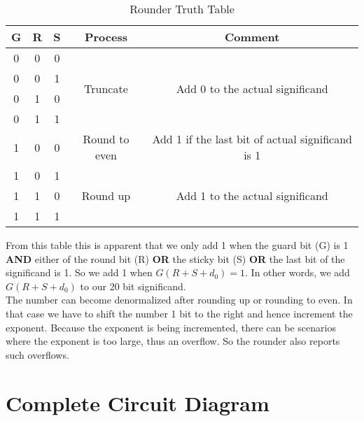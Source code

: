 \documentclass[14pt]{article}
\begin{document}
\begin{table}[!h]
	\begin{center}
		\begin{tabular}{|c|c|c|c|c|}
			\hline
			\textbf{G} & \textbf{R} & \textbf{S} & \textbf{Process} & \textbf{Comment}\\
			\hline
			0 & 0 & 0 & \multirow{4}{*}{Truncate} & \multirow{4}{*}{Add 0 to the actual significand}\\
			\cline{1-3}
			0 & 0 & 1 & &\\
			\cline{1-3}
			0 & 1 & 0 & &\\
			\cline{1-3}
			0 & 1 & 1 & &\\
			\hline
			1 & 0 & 0 & Round to even & Add 1 if the last bit of actual significand is 1\\
			\hline
			1 & 0 & 1 & \multirow{3}{*}{Round up} & \multirow{3}{*}{Add 1 to the actual significand}\\
			\cline{1-3}
			1 & 1 & 0 & & \\
			\cline{1-3}
			1 & 1 & 1 & & \\
			\hline
		\end{tabular}
		\caption{Rounder Truth Table}
	\end{center}
\end{table}
From this table this is apparent that we only add 1 when the guard bit (G) is 1 \textbf{AND} either of the round bit (R) \textbf{OR} the sticky bit (S) \textbf{OR} the last bit of the significand is 1. So we add 1 when $G(R + S + d_0) = 1$. In other words, we add $G(R + S + d_0)$ to our 20 bit significand.\\

The number can become denormalized after rounding up or rounding to even. In that case we have to shift the number 1 bit to the right and hence increment the exponent. Because the exponent is being incremented, there can be scenarios where the exponent is too large, thus an overflow. So the rounder also reports such overflows.

\section{Complete Circuit Diagram}
\end{document}
